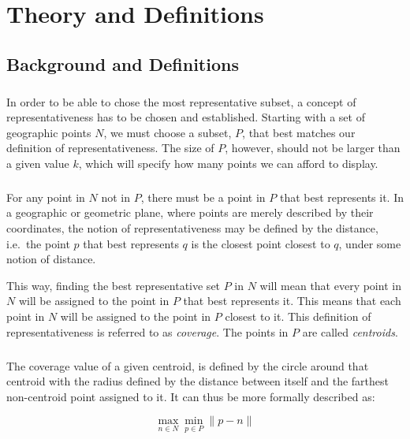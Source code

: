 \chapter{Theory and Definitions}
\label{chap:theory}


\section{Background and Definitions}
\label{sect:problem}
\paragraph{}
In order to be able to chose the most representative subset, a concept of representativeness has to be chosen and established. 
Starting with a set of geographic points $N$, we must choose a subset, $P$, that best matches our definition of representativeness. The size of $P$, however, should not be larger than a given value $k$, which will specify how many points we can afford to display.

\paragraph{}
For any point in $N$ not in $P$, there must be a point in $P$ that best represents it. In a geographic or geometric plane, where points are merely described by their coordinates, the notion of representativeness may be defined by the distance, i.e.\ the point $p$ that best represents $q$ is the closest point closest to $q$, under some notion of distance. 

This way, finding the best representative set $P$ in $N$ will mean that every point in $N$ will be assigned to the point in $P$ that best represents it. This means that each point in $N$ will be assigned to the point in $P$ closest to it. This definition of representativeness is referred to as \textit{coverage}. The points in $P$ are called \textit{centroids}.

\paragraph{}
The coverage value of a given centroid, is defined by the circle around that centroid with the radius defined by the distance between itself and the farthest non-centroid point assigned to it. It can thus be more formally described as:

\begin{equation}
\max_{n \in N}
	{\min_{p \in P}
		{\lVert p-n \rVert}
	}
\end{equation}

